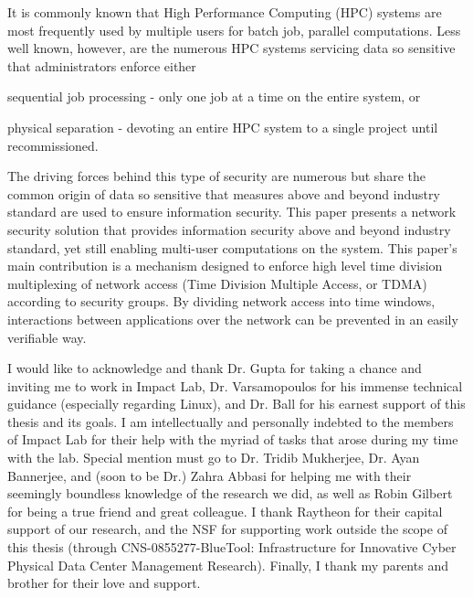 \documentclass[oneside,12pt]{memoir}
\begin{document}
\pagestyle{plain}  %
\frontmatter
\thetitlepage

\setcounter{page}{1}
\asuabstract 
It is commonly known that High Performance Computing (HPC) systems are most frequently used by multiple users for batch job, parallel computations. Less well known, however, are the numerous HPC systems servicing data so sensitive that administrators enforce either \begin{inparaenum} 
\item sequential job processing - only one job at a time on the entire system, or
\item physical separation - devoting an entire HPC system to a single project until recommissioned.
\end{inparaenum}
The driving forces behind this type of security are numerous but share the common origin of data so sensitive that measures above and beyond industry standard are used to ensure information security. This paper presents a network security solution that provides information security above and beyond industry standard, yet still enabling multi-user computations on the system. This paper's main contribution is a mechanism designed to enforce high level time division multiplexing of network access (Time Division Multiple Access, or TDMA) according to security groups. By dividing network access into time windows, interactions between applications over the network can be prevented in an easily verifiable way. 

\asuacknowledgements
{I would like to acknowledge and thank Dr. Gupta for taking a chance and inviting me to work in Impact Lab, Dr. Varsamopoulos for his immense technical guidance (especially regarding Linux), and Dr. Ball for his earnest support of this thesis and its goals. I am intellectually and personally indebted to the members of Impact Lab for their help with the myriad of tasks that arose during my time with the lab. Special mention must go to Dr. Tridib Mukherjee, Dr. Ayan Bannerjee, and (soon to be Dr.) Zahra Abbasi for helping me with their seemingly boundless knowledge of the research we did, as well as Robin Gilbert for being a true friend and great colleague. I thank Raytheon for their capital support of our research, and the NSF for supporting work outside the scope of this thesis (through CNS-0855277-BlueTool: Infrastructure for Innovative Cyber Physical Data Center Management Research). Finally, I thank my parents and brother for their love and support.
}
\end{document}
